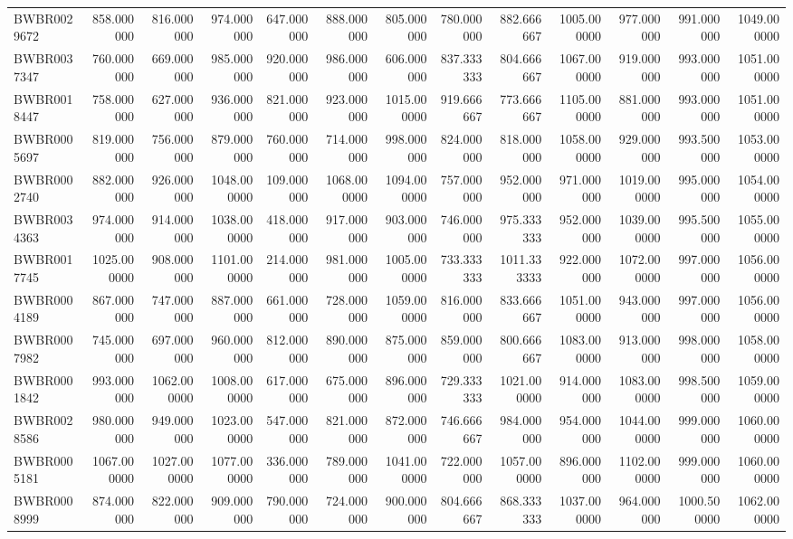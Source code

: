 \begin{longtable}{lrrrrrrrrrrrr}
BWBR0029672 & 858.000000 & 816.000000 & 974.000000 & 647.000000 & 888.000000 & 805.000000 & 780.000000 & 882.666667 & 1005.000000 & 977.000000 & 991.000000 & 1049.000000 \\
BWBR0037347 & 760.000000 & 669.000000 & 985.000000 & 920.000000 & 986.000000 & 606.000000 & 837.333333 & 804.666667 & 1067.000000 & 919.000000 & 993.000000 & 1051.000000 \\
BWBR0018447 & 758.000000 & 627.000000 & 936.000000 & 821.000000 & 923.000000 & 1015.000000 & 919.666667 & 773.666667 & 1105.000000 & 881.000000 & 993.000000 & 1051.000000 \\
BWBR0005697 & 819.000000 & 756.000000 & 879.000000 & 760.000000 & 714.000000 & 998.000000 & 824.000000 & 818.000000 & 1058.000000 & 929.000000 & 993.500000 & 1053.000000 \\
BWBR0002740 & 882.000000 & 926.000000 & 1048.000000 & 109.000000 & 1068.000000 & 1094.000000 & 757.000000 & 952.000000 & 971.000000 & 1019.000000 & 995.000000 & 1054.000000 \\
BWBR0034363 & 974.000000 & 914.000000 & 1038.000000 & 418.000000 & 917.000000 & 903.000000 & 746.000000 & 975.333333 & 952.000000 & 1039.000000 & 995.500000 & 1055.000000 \\
BWBR0017745 & 1025.000000 & 908.000000 & 1101.000000 & 214.000000 & 981.000000 & 1005.000000 & 733.333333 & 1011.333333 & 922.000000 & 1072.000000 & 997.000000 & 1056.000000 \\
BWBR0004189 & 867.000000 & 747.000000 & 887.000000 & 661.000000 & 728.000000 & 1059.000000 & 816.000000 & 833.666667 & 1051.000000 & 943.000000 & 997.000000 & 1056.000000 \\
BWBR0007982 & 745.000000 & 697.000000 & 960.000000 & 812.000000 & 890.000000 & 875.000000 & 859.000000 & 800.666667 & 1083.000000 & 913.000000 & 998.000000 & 1058.000000 \\
BWBR0001842 & 993.000000 & 1062.000000 & 1008.000000 & 617.000000 & 675.000000 & 896.000000 & 729.333333 & 1021.000000 & 914.000000 & 1083.000000 & 998.500000 & 1059.000000 \\
BWBR0028586 & 980.000000 & 949.000000 & 1023.000000 & 547.000000 & 821.000000 & 872.000000 & 746.666667 & 984.000000 & 954.000000 & 1044.000000 & 999.000000 & 1060.000000 \\
BWBR0005181 & 1067.000000 & 1027.000000 & 1077.000000 & 336.000000 & 789.000000 & 1041.000000 & 722.000000 & 1057.000000 & 896.000000 & 1102.000000 & 999.000000 & 1060.000000 \\
BWBR0008999 & 874.000000 & 822.000000 & 909.000000 & 790.000000 & 724.000000 & 900.000000 & 804.666667 & 868.333333 & 1037.000000 & 964.000000 & 1000.500000 & 1062.000000 \\

\end{longtable}

